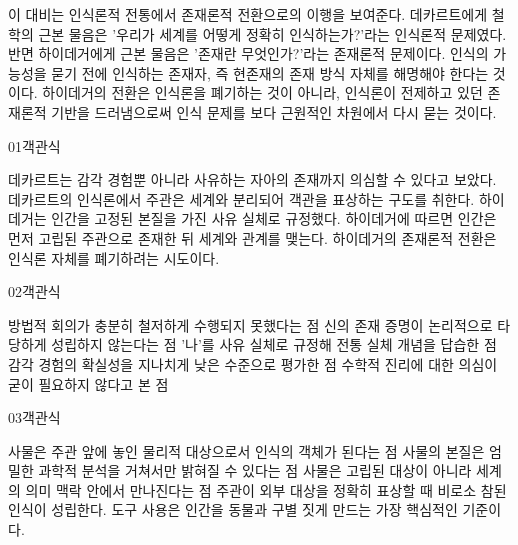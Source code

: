 \documentclass[fs85,seriesWit]{korfarm-base}
\begin{document}
{이 대비는 인식론적 전통에서 존재론적 전환으로의 이행을 보여준다. 데카르트에게 철학의 근본 물음은 '우리가 세계를 어떻게 정확히 인식하는가?'라는 인식론적 문제였다. 반면 하이데거에게 근본 물음은 '존재란 무엇인가?'라는 존재론적 문제이다. 인식의 가능성을 묻기 전에 인식하는 존재자, 즉 현존재의 존재 방식 자체를 해명해야 한다는 것이다. 하이데거의 전환은 인식론을 폐기하는 것이 아니라, 인식론이 전제하고 있던 존재론적 기반을 드러냄으로써 인식 문제를 보다 근원적인 차원에서 다시 묻는 것이다.
}\kfResetAreaFlag
{}

\kfBeginMC
\begin{kfQBlock}{01}{객관식}
\begin{kfChoices}
\kfChoice 데카르트는 감각 경험뿐 아니라 사유하는 자아의 존재까지 의심할 수 있다고 보았다.
\kfChoice 데카르트의 인식론에서 주관은 세계와 분리되어 객관을 표상하는 구도를 취한다.
\kfChoice 하이데거는 인간을 고정된 본질을 가진 사유 실체로 규정했다.
\kfChoice 하이데거에 따르면 인간은 먼저 고립된 주관으로 존재한 뒤 세계와 관계를 맺는다.
\kfChoice 하이데거의 존재론적 전환은 인식론 자체를 폐기하려는 시도이다.
\end{kfChoices}
\end{kfQBlock}

\begin{kfQBlock}{02}{객관식}
\begin{kfChoices}
\kfChoice 방법적 회의가 충분히 철저하게 수행되지 못했다는 점
\kfChoice 신의 존재 증명이 논리적으로 타당하게 성립하지 않는다는 점
\kfChoice '나'를 사유 실체로 규정해 전통 실체 개념을 답습한 점
\kfChoice 감각 경험의 확실성을 지나치게 낮은 수준으로 평가한 점
\kfChoice 수학적 진리에 대한 의심이 굳이 필요하지 않다고 본 점
\end{kfChoices}
\end{kfQBlock}

\begin{kfQBlock}{03}{객관식}
\begin{kfChoices}
\kfChoice 사물은 주관 앞에 놓인 물리적 대상으로서 인식의 객체가 된다는 점
\kfChoice 사물의 본질은 엄밀한 과학적 분석을 거쳐서만 밝혀질 수 있다는 점
\kfChoice 사물은 고립된 대상이 아니라 세계의 의미 맥락 안에서 만나진다는 점
\kfChoice 주관이 외부 대상을 정확히 표상할 때 비로소 참된 인식이 성립한다.
\kfChoice 도구 사용은 인간을 동물과 구별 짓게 만드는 가장 핵심적인 기준이다.
\end{kfChoices}
\end{kfQBlock}
\end{document}
